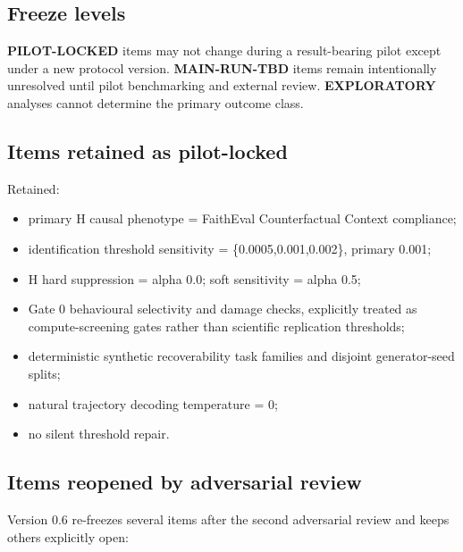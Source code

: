 \subsection{Freeze levels}\label{freeze-levels}

\textbf{PILOT-LOCKED} items may not change during a result-bearing pilot except under a new protocol version. \textbf{MAIN-RUN-TBD} items remain intentionally unresolved until pilot benchmarking and external review. \textbf{EXPLORATORY} analyses cannot determine the primary outcome class.

\subsection{Items retained as pilot-locked}\label{pilot-locked-items}

Retained:

\begin{itemize}
\tightlist
\item primary H causal phenotype = FaithEval Counterfactual Context compliance;
\item identification threshold sensitivity = \{0.0005,0.001,0.002\}, primary 0.001;
\item H hard suppression = alpha 0.0; soft sensitivity = alpha 0.5;
\item Gate 0 behavioural selectivity and damage checks, explicitly treated as compute-screening gates rather than scientific replication thresholds;
\item deterministic synthetic recoverability task families and disjoint generator-seed splits;
\item natural trajectory decoding temperature = 0;
\item no silent threshold repair.
\end{itemize}

\subsection{Items reopened by adversarial review}\label{items-reopened-by-review}

Version 0.6 re-freezes several items after the second adversarial review and keeps others explicitly open:

